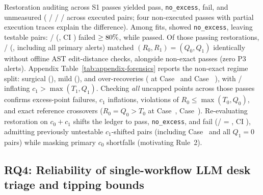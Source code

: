 \documentclass[11pt]{article}
\newcommand{\CaseRef}[1]{Case~#1}
\begin{document}
Restoration auditing across \BenchConfSTwoPassN{} S1 passes yielded \BenchRestPassAllN{} pass, \BenchRestNoExAllN{} \texttt{no\_excess}, \BenchRestFailAllN{} fail, and \BenchRestUnmeasAllN{} unmeasured (\BenchRestExecPassN{} / \BenchRestExecNoExN{} / \BenchRestExecFailN{} / \BenchRestExecUnmeasN{} across \BenchPOneCount{} executed pairs; four non-executed passes with partial execution traces explain the difference).
Among \BenchFittedClusters{} fits, \BenchRestFitNoExN{} showed \texttt{no\_excess}, leaving \BenchRestFitExcessN{} testable pairs: \BenchRestFitFailN{}/\BenchRestFitExcessN{} (\BenchRestFitFailPct{}, CI \BenchRestFitFailCI{}) failed $\ge 80\%{}$, while \BenchRestFitPassN{} passed. Of those passing restorations, \BenchRestExactCopyN{}/\BenchRestFitPassN{} (\BenchRestExactCopyPct{}, including all \BenchPThreeCount{} primary alerts) matched $(R_0, R_1) = (Q_0, Q_1)$ identically without offline AST edit-distance checks, alongside \BenchRestNonExactPassN{} non-exact passes (zero P3 alerts). Appendix Table~\ref{tab:appendix-forensics} reports the non-exact regime split: \BenchRestSurgicalN{} surgical (\BenchRestSurgicalBand{}), \BenchRestMildOverN{} mild (\BenchRestMildBand{}), and \BenchRestHighOverN{} over-recoveries (\BenchRestHighBand{} at \CaseRef{\BenchPosNineOne{}} \BenchRestOverNineOneRange{} and \CaseRef{\BenchPosOneTwoNine{}} \BenchRestOverOneTwoNineRange{}), with \BenchRestCOneInflN{}/\BenchRestNonExactPassN{} inflating $c_1 > \max(T_1, Q_1)$.
Checking \emph{all} uncapped points across those \BenchRestFitPassN{} passes confirms \BenchAllPtExcessFailN{} excess-point failures, \BenchAllPtRoneInflN{} $c_1$ inflations, \BenchAllPtMaxBoundFailN{} violations of $R_0 \le \max(T_0, Q_0)$, and \BenchAllPtNonRegFailN{} exact reference crossovers ($R_0 = Q_0 > T_0$ at \CaseRef{\BenchPosEighteen{}}, \CaseRef{\BenchPosFourFour{}}).
Re-evaluating \BenchRecovery{} restoration on $c_0 + c_1$ shifts the ledger to \BenchRestTotPassN{} pass, \BenchRestTotNoExN{} \texttt{no\_excess}, and \BenchRestTotFailN{} fail (\BenchRestTotFailN{}/\BenchRestTotExcessN{} = \BenchRestTotFailPct{}, CI \BenchRestTotFailCI{}), admitting \BenchRestTotNewTestN{} previously untestable $c_1$-shifted pairs (including \CaseRef{\BenchPosFourSeven{}} and all \BenchQOneZeroCount{} $Q_1=0$ pairs) while masking \BenchRestCOneMaskN{} primary $c_0$ shortfalls (motivating Rule~2).

\subsection{RQ4: Reliability of single-workflow LLM desk triage and tipping bounds}
\label{sec:rq4}
\end{document}
